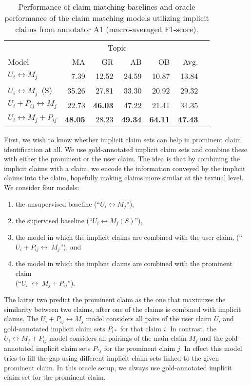 \begin{table}
\begin{center}
{\small
\setlength{\tabcolsep}{5.9pt}
\begin{tabular}{lrrrrrr}
\toprule
&\multicolumn{4}{c}{Topic}\\
\cmidrule(lr){2-5}
Model & MA & GR  & AB & OB & Avg. \\
\midrule
$U_i \leftrightarrow M_j$      & 7.39          & 12.52        & 24.59        & 10.87        & 13.84 \\
$U_i \leftrightarrow M_j$\ (S)  & 35.26         & 27.81        & 33.30        & 20.92        & 29.32 \\
$U_i + P_{ij} \leftrightarrow M_j$   & 22.73         & {\bf 46.03}  & 47.22        & 21.41        & 34.35 \\
$U_i \leftrightarrow M_j + P_{ij} $ & {\bf 48.05}   & 28.23        & {\bf 49.34}  & {\bf 64.11}  & {\bf 47.43} \\
\bottomrule
\end{tabular}}
\caption{Performance of claim matching baselines and oracle performance of the
claim matching models utilizing implicit claims from annotator A1
(macro-averaged F1-score).}
\label{tab:argpremise_matching}
\end{center}
\end{table}

First, we wish to know whether implicit claim sets can help in 
prominent claim identification at all. We use gold-annotated 
implicit claim sets and combine these with either the prominent
or the user claim. 
The idea is that by combining the implicit claims with a claim, we encode 
the information conveyed by the implicit claims into the claim, 
hopefully making claims more similar at the textual level. 
We consider four models: \begin{enumerate}[label=\arabic*)]
\item the unsupervised baseline (``$U_i \leftrightarrow M_j$''),
\item the supervised baseline (``$U_i \leftrightarrow M_j (S)$''), 
\item the model in which the implicit claims are combined with the user claim,
	(``$U_i+P_{ij}\leftrightarrow~M_j$''), and 
\item the model in which the implicit claims are combined with the prominent claim  \\
	(``$U_i~\leftrightarrow~M_j+P_{ij}$''). 
\end{enumerate}
The latter two predict the prominent claim as the one that maximizes the 
similarity between two claims, after one of the claims is combined with implicit claims.
The $U_i + P_{ij} \leftrightarrow M_j$ model considers all pairs of the user claim $U_i$ 
and gold-annotated implicit claim sets $P_{i*}$ for that claim $i$. 
In contrast, the $U_i \leftrightarrow M_j + P_{ij}$ model considers all pairings
of the main claim $M_j$ and the gold-annotated implicit claim sets $P_{*j}$ for the prominent 
claim $j$. 
In effect this model tries to fill the gap using different implicit claim sets linked
to the given prominent claim. 
In this oracle setup, we always use gold-annotated implicit claim set for the
prominent claim. 

